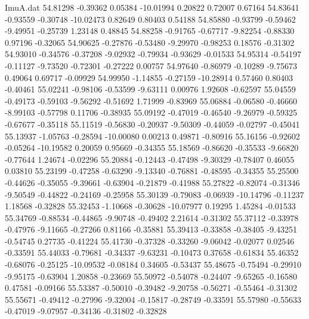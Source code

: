\begin{filecontents}{ImuA.dat}
  54.81298   -0.39362    0.05384  -10.01994    0.20822    0.72007    0.67164
  54.83641   -0.93559   -0.30748  -10.02473    0.82649    0.80403    0.54188
  54.85880   -0.93799   -0.59462   -9.49951   -0.25739    1.23148    0.48845
  54.88258   -0.91765   -0.67717   -9.82254   -0.88330    0.97196   -0.32065
  54.90625   -0.27876   -0.53480   -9.29970   -0.98253    0.18576   -0.31302
  54.93010   -0.34576   -0.37208   -9.02932   -0.79934   -0.93629   -0.01533
  54.95314   -0.54197   -0.11127   -9.73520   -0.72301   -0.27222    0.00757
  54.97640   -0.86979   -0.10289   -9.75673    0.49064    0.69717   -0.09929
  54.99950   -1.14855   -0.27159  -10.28914    0.57460    0.80403   -0.40461
  55.02241   -0.98106   -0.53599   -9.63111    0.00976    1.92608   -0.62597
  55.04559   -0.49173   -0.59103   -9.56292   -0.51692    1.71999   -0.83969
  55.06884   -0.06580   -0.46660   -8.99103   -0.57798    0.11706   -0.38935
  55.09192   -0.47019   -0.46540   -9.26979   -0.59325   -0.67677   -0.35118
  55.11519   -0.56830   -0.20937   -9.50309   -0.44059   -0.02797   -0.45041
  55.13937   -1.05763   -0.28594  -10.00080    0.00213    0.49871   -0.80916
  55.16156   -0.92602   -0.05264  -10.19582    0.20059    0.95669   -0.34355
  55.18569   -0.86620   -0.35533   -9.66820   -0.77644    1.24674   -0.02296
  55.20884   -0.12443   -0.47498   -9.30329   -0.78407    0.46055    0.03810
  55.23199   -0.47258   -0.63290   -9.13340   -0.76881   -0.48595   -0.34355
  55.25500   -0.44626   -0.35055   -9.39661   -0.63904   -0.21879   -0.41988
  55.27822   -0.82074   -0.31346   -9.50549   -0.44822   -0.24169   -0.25958
  55.30139   -0.79083   -0.06939  -10.14796   -0.11237    1.18568   -0.32828
  55.32453   -1.10668   -0.30628  -10.07977    0.19295    1.45284   -0.01533
  55.34769   -0.88534   -0.44865   -9.90748   -0.49402    2.21614   -0.31302
  55.37112   -0.33978   -0.47976   -9.11665   -0.27266    0.81166   -0.35881
  55.39413   -0.33858   -0.38405   -9.43251   -0.54745    0.27735   -0.41224
  55.41730   -0.37328   -0.33260   -9.06042   -0.02077    0.02546   -0.33591
  55.44033   -0.79681   -0.34337   -9.63231   -0.10473    0.37658   -0.61834
  55.46352   -0.68076   -0.25125  -10.09532   -0.08184    0.34605   -0.53437
  55.48675   -0.75494   -0.29910   -9.95175   -0.63904    1.20858   -0.23669
  55.50972   -0.54078   -0.24407   -9.65265   -0.16580    0.47581   -0.09166
  55.53387   -0.50010   -0.39482   -9.20758   -0.56271   -0.55464   -0.31302
  55.55671   -0.49412   -0.27996   -9.32004   -0.15817   -0.28749   -0.33591
  55.57980   -0.55633   -0.47019   -9.07957   -0.34136   -0.31802   -0.32828

\end{filecontents}
